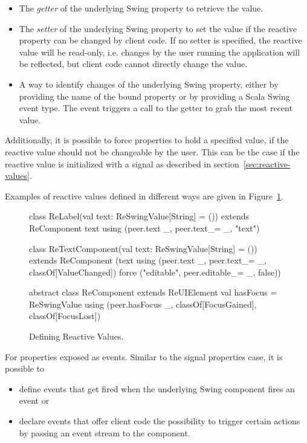 \documentclass{scrartcl}
\begin{document}
\begin{itemize}
\item The \emph{getter} of the underlying Swing property to retrieve
the value.
\item The \emph{setter} of the underlying Swing property to set the
value if the reactive property can be changed by client code. If no
setter is specified, the reactive value will be read-only, i.e.
changes by the user running the application will be reflected, but
client code cannot directly change the value.
\item A way to identify changes of the underlying Swing property,
either by providing the name of the bound property or by providing a
Scala Swing event type. The event triggers a call to the getter to
grab the most recent value.
\end{itemize}

Additionally, it is possible to force properties to hold a specified
value, if the reactive value should not be changeable by the
user. This can be the case if the reactive value is initialized with a
signal as described in section~\ref{sec:reactive-values}.

Examples of reactive values defined in different ways are given in
Figure~\ref{lst:defining-reactive-values}.

\begin{figure}[htp]
\begin{codenv}
class ReLabel(val text: ReSwingValue[String] = ()) 
                             extends ReComponent {
  text using (peer.text _, peer.text_= _, "text")
}

class ReTextComponent(val text: ReSwingValue[String] = ()) 
                            extends ReComponent {
  (text using (peer.text _, peer.text_= _, classOf[ValueChanged])
        force ("editable", peer.editable_= _, false))
}

abstract class ReComponent extends ReUIElement {
  val hasFocus = ReSwingValue using (peer.hasFocus _, classOf[FocusGained],
                                                      classOf[FocusLost])
}
\end{codenv}
\caption{Defining Reactive Values.}
\label{lst:defining-reactive-values}
\end{figure}

For properties exposed as events. Similar to the signal properties
case, it is possible to
\begin{itemize}
\item define events that get fired when the underlying Swing component
fires an event or
\item declare events that offer client code the possibility to trigger
certain actions by passing an event stream to the component.
\end{itemize}
\end{document}
